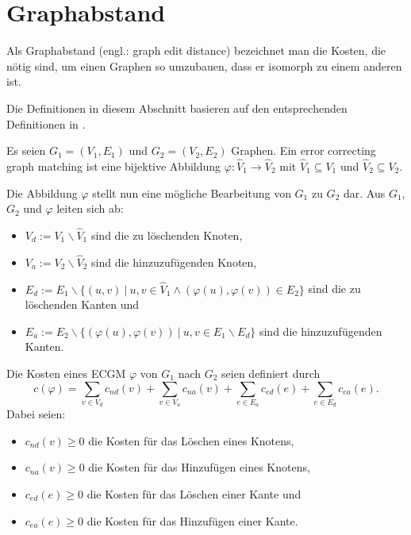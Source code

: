 \section{Graphabstand}\label{sec:Graphabstand}
Als Graphabstand (engl.: graph edit distance) bezeichnet man die Kosten, 
die nötig sind, um einen Graphen so umzubauen, dass er isomorph zu einem 
anderen ist. 

Die Definitionen in diesem Abschnitt basieren auf den entsprechenden Definitionen 
in \cite{Bunke:1997}.

\begin{mydef}
Es seien $G_1=(V_1,E_1)$ und $G_2=(V_2,E_2)$ Graphen. Ein 
error correcting graph matching ist eine bijektive Abbildung 
$\varphi:\hat{V}_1 \rightarrow \hat{V}_2$ mit $\hat{V}_1 
\subseteq V_1$ und $\hat{V}_2 \subseteq V_2$.
\end{mydef}

Die Abbildung $\varphi$ stellt nun eine mögliche Bearbeitung von $G_1$ 
zu $G_2$ dar. Aus $G_1$, $G_2$ und $\varphi$ leiten sich ab: 
\begin{itemize}
	\item $V_d:=V_1 \backslash \hat{V}_1$ sind die zu löschenden Knoten,
	\item $V_a:=V_2 \backslash \hat{V}_2$ sind die hinzuzufügenden Knoten,
	\item $E_d:=E_1 \backslash \{(u,v) \ |\ u,v \in \hat{V}_1 \wedge (\varphi(u),
	       \varphi(v)) \in E_2\}$ sind die zu löschenden Kanten und
	\item $E_a:=E_2 \backslash \{(\varphi(u),\varphi(v))\ |\ u,v \in E_1 
	       \backslash E_d\}$ sind die hinzuzufügenden Kanten.
\end{itemize}

\begin{mydef}
Die Kosten eines ECGM $\varphi$ von $G_1$ nach $G_2$ seien definiert durch
\[
c(\varphi)=\sum_{v \in V_d}c_{nd}(v) + \sum_{v \in V_a}c_{na}(v) + 
  \sum_{e \in E_a}c_{ed}(e) + \sum_{e \in E_d}c_{ea}(e).
\]
Dabei seien: 
\begin{itemize}
	\item $c_{nd}(v) \geq 0$ die Kosten für das Löschen eines Knotens,
	\item $c_{na}(v) \geq 0$ die Kosten für das Hinzufügen eines Knotens,
	\item $c_{ed}(e) \geq 0$ die Kosten für das Löschen einer Kante und
	\item $c_{ea}(e) \geq 0$ die Kosten für das Hinzufügen einer Kante.
\end{itemize}
\end{mydef}

